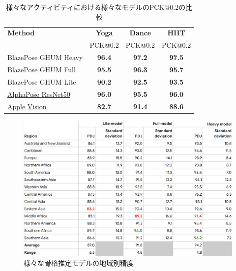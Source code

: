   \begin{table}[ht]
    \centering
    \caption{様々なアクティビティにおける様々なモデルのPCK@0.2の比較 \cite{pose-estimation-quality}}
    \begin{tabular}{|l|c|c|c|}
    \hline
    \textbf{Method} & \textbf{Yoga} & \textbf{Dance} & \textbf{HIIT} \\
                    & PCK@0.2       & PCK@0.2        & PCK@0.2       \\ 
    \hline
    BlazePose GHUM Heavy                                                      & \textbf{96.4} & \textbf{97.2} & \textbf{97.5} \\
    BlazePose GHUM Full                                                       & \textbf{95.5} & \textbf{96.3} & \textbf{95.7} \\
    BlazePose GHUM Lite                                                       & \textbf{90.2} & \textbf{92.5} & \textbf{93.5} \\
    \href{https://github.com/MVIG-SJTU/AlphaPose}{AlphaPose ResNet50}         & \textbf{96.0} & \textbf{95.5} & \textbf{96.0} \\
    \href{https://developer.apple.com/documentation/vision/detecting_human_body_poses_in_images}{Apple Vision} & \textbf{82.7} & \textbf{91.4} & \textbf{88.6} \\
    \hline
    \end{tabular}
    \label{tab:pose-estimation-quality}
  \end{table}
    
  \begin{figure}[H]
    \begin{center}
    \includegraphics[width=12cm]{figures/Model_Accuracy_by_Race.png}
    \caption{様々な骨格推定モデルの地域別精度 \cite{Model-Accuracy-by-Race}}
    \label{fig:Model-Accuracy-by-Race}
    \end{center}
  \end{figure}

